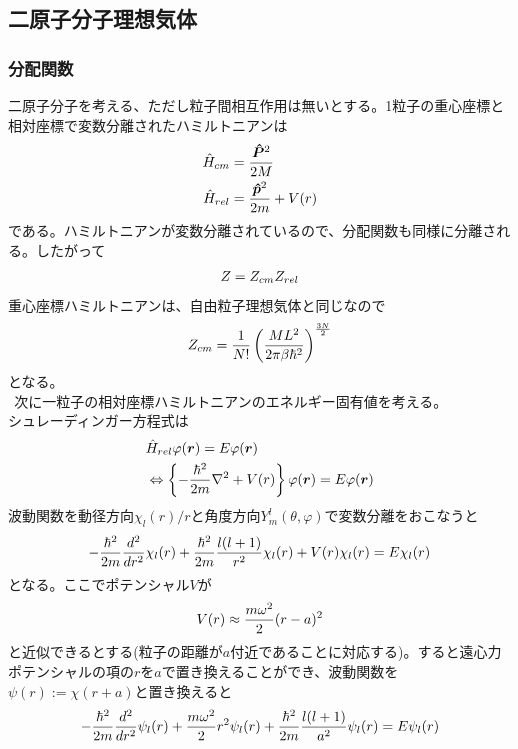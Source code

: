 \documentclass[dvipdfmx, 11pt, a4paper]{jsarticle}
\theoremstyle{definition}
\begin{document}
\subsection{二原子分子理想気体}
\subsubsection{分配関数}
    二原子分子を考える、ただし粒子間相互作用は無いとする。1粒子の重心座標と相対座標で変数分離されたハミルトニアンは
    \begin{align}
        \hat{H}_{cm} &= \frac{\bm{\hat{P}}^2}{2M} \notag \\
        \hat{H}_{rel} &= \frac{\bm{\hat{p}}^2}{2m} + V(r) \notag 
    \end{align}
    である。ハミルトニアンが変数分離されているので、分配関数も同様に分離される。したがって
    \begin{align}
        Z = Z_{cm}Z_{rel} \notag 
    \end{align}
    重心座標ハミルトニアンは、自由粒子理想気体と同じなので
    \begin{align}
        Z_{cm} = \frac{1}{N!} \left( \frac{ML^2}{2\pi \beta \hbar^2 } \right)^{\frac{3N}{2}} \notag 
    \end{align}
    となる。\\
    $\ \ $次に一粒子の相対座標ハミルトニアンのエネルギー固有値を考える。\\
    シュレーディンガー方程式は
    \begin{align}
        &\hat{H}_{rel} \varphi(\bm{r}) = E\varphi(\bm{r}) \notag \\
        &\Leftrightarrow \left\{ -\frac{\hbar^2}{2m}\nabla^2 + V(r)\right\} \varphi(\bm{r}) = E\varphi(\bm{r}) \notag 
    \end{align}
    波動関数を動径方向$\chi_l(r) / r$と角度方向$Y^l_m(\theta,\varphi)$で変数分離をおこなうと
    \begin{align}
        -\frac{\hbar^2}{2m} \frac{d^2}{dr^2} \chi_l(r) + \frac{\hbar^2}{2m} \frac{l(l+1)}{r^2} \chi_l(r) + V(r) \chi_l(r) = E\chi_l(r) \notag 
    \end{align}
    となる。ここでポテンシャル$V$が
    \begin{align}
        V(r) \approx \frac{m\omega^2}{2}(r-a)^2 \notag
    \end{align}
    と近似できるとする(粒子の距離が$a$付近であることに対応する)。すると遠心力ポテンシャルの項の$r$を$a$で置き換えることができ、波動関数を$\psi(r) := \chi(r+a)$と置き換えると
    \begin{align}
        -\frac{\hbar^2}{2m} \frac{d^2}{dr^2} \psi_l(r) + \frac{m\omega^2}{2}r^2 \psi_l(r) + \frac{\hbar^2}{2m} \frac{l(l+1)}{a^2} \psi_l(r) = E\psi_l(r) \notag 
    \end{align}
\end{document}
